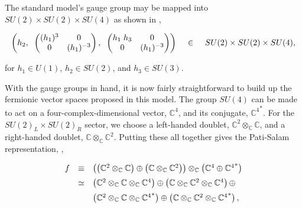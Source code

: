 \documentclass[letterpaper,12pt,titlepage,oneside,final]{book}
\newcommand{\C}{\mathbb{C}}
\begin{document}
The standard model's gauge group may be mapped into $SU(2)\times SU(2) \times SU(4)$ as shown in \cite{agut},

\begin{equation}
\left( h_2, \hspace{2mm} \left(\begin{matrix}(h_1)^3&0\\0&(h_1)^{-3} \end{matrix}\right), \hspace{2mm} \left(\begin{matrix}h_1\hspace{1mm}h_3&0\\0&(h_1)^{-3} \end{matrix}\right) \right) \hspace{4mm}\in\hspace{4mm}SU(2)\times SU(2) \times SU(4) ,
\end{equation}


\noindent for $h_1\in U(1)$, $h_2\in SU(2)$, and $h_3 \in SU(3)$.

With the gauge groups in hand, it is now fairly straightforward to build up the fermionic vector spaces proposed in this model.  The group $SU(4)$ can be made to act on a four-complex-dimensional vector, $\C^4$, and its conjugate, ${\C^4}^*$.  For the $SU(2)_L\times SU(2)_R$ sector, we choose a left-handed doublet, $\C^2 \otimes_{\C} \C$, and a right-handed doublet, $\C\otimes_{\C} \C^2$.  Putting these all together gives the Pati-Salam representation, \cite{agut}, 

\begin{equation} \begin{array}{lll}f& \equiv& \left(\left(    \C^2 \otimes_{\C} \C      \right)  \oplus   \left(   \C\otimes_{\C} \C^2    \right)    \right)  \otimes_{\C}  \left( \C^4 \oplus {\C^4}^* \right)\vspace{2mm} \\

&\simeq& \left(  \C^2 \otimes_{\C} \C  \otimes_{\C}\C^4\right)   \oplus    \left(\C \otimes_{\C} \C^2  \otimes_{\C}\C^4 \right)\oplus      \vspace{2mm} \\

& & \left(\C^2 \otimes_{\C} \C  \otimes_{\C}{\C^4}^* \right)   \oplus  \left(  \C \otimes_{\C} \C^2  \otimes_{\C}{\C^4}^*\right),
\end{array}\end{equation}
\end{document}

